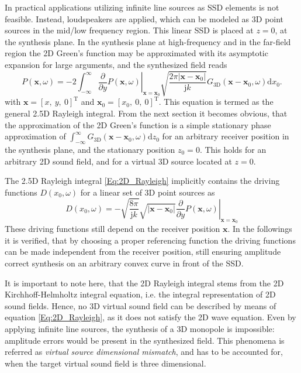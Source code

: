 \documentclass[12pt,a4paper]{article}
\newcommand{\td}{\mathrm{d}}
\newcommand{\ti}{\mathrm{j}}
\newcommand{\vx}{\mathbf{x}}
\newcommand{\vxo}{\mathbf{x}_0}
\begin{document}
In practical applications utilizing infinite line sources as SSD elements is not feasible. Instead, loudspeakers are applied, which can be modeled as 3D point sources in the mid/low frequency region. This linear SSD is placed at $z=0$, at the synthesis plane.
In the synthesis plane at high-frequency and in the far-field region the 2D Green's function may be approximated with its asymptotic expansion for large arguments, and the synthesized field reads
\begin{equation}
P(\vx,\omega) = 
-2 \int_{-\infty}^{\infty} \left. \frac{\partial}{\partial y}  P(\vx,\omega) \right|_{\vx = \vxo} \sqrt{\frac{2\pi |\vx-\vxo|}{\ti k}} G_{3\mathrm{D}}(\vx - \vxo,\omega) \td x_0.
\label{Eq:2.5D_Rayleigh}
\end{equation}
with $\vx = [x,\ y,\ 0]^{\mathrm{T}}$ and $\vxo = [x_0,\ 0,\ 0]^{\mathrm{T}}$. This equation is termed as the general 2.5D Rayleigh integral. From the next section it becomes obvious, that the approximation of the 2D Green's function is a simple stationary phase approximation of $\int_{-\infty}^{\infty} G_{3\mathrm{D}}(\vx - \vxo,\omega) \td z_0$  for an arbitrary receiver position in the synthesis plane, and the stationary position $z_0 = 0$.
This holds for an arbitrary 2D sound field, and for a virtual 3D source located at $z=0$.

The 2.5D Rayleigh integral \eqref{Eq:2D_Rayleigh} implicitly contains the driving functions $D(x_0, \omega)$ for a linear set of 3D point sources as
%
\begin{equation}
D(x_0,\omega) = 
- \sqrt{\frac{8\pi}{\ti k}} \sqrt{|\vx-\vxo|} \left. \frac{\partial}{\partial y} P(\vx,\omega) \right|_{\vx=\vxo}
\label{Eq:2_5D_driv_fun_implicit}
\end{equation}
These driving functions still depend on the receiver position $\vx$. In the followings it is verified, that by choosing a proper referencing function the driving functions can be made independent from the receiver position, still ensuring amplitude correct synthesis on an arbitrary convex curve in front of the SSD.

\vspace{3mm}

It is important to note here, that the 2D Rayleigh integral stems from the 2D Kirchhoff-Helmholtz integral equation, i.e. the integral representation of 2D sound fields. Hence, no 3D virtual sound field can be described by means of equation \eqref{Eq:2D_Rayleigh}, as it does not satisfy the 2D wave equation. Even by applying infinite line sources, the synthesis of a 3D monopole is impossible: amplitude errors would be present in the synthesized field. This phenomena is referred as \emph{virtual source dimensional mismatch}, and has to be accounted for, when the target virtual sound field is three dimensional.
\end{document}
